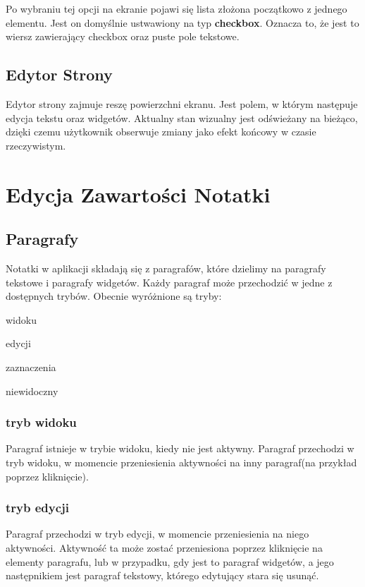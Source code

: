 \documentclass[shortabstract]{iithesis}
\begin{document}
Po wybraniu tej opcji na ekranie pojawi się lista złożona początkowo z jednego elementu.
Jest on domyślnie ustwawiony na typ \textbf{checkbox}. Oznacza to, że jest to wiersz zawierający checkbox oraz puste pole tekstowe.

\subsection{Edytor Strony}

Edytor strony zajmuje reszę powierzchni ekranu. Jest polem, w którym następuje edycja tekstu oraz widgetów. Aktualny stan wizualny jest odświeżany na bieżąco, dzięki czemu użytkownik obserwuje zmiany jako efekt końcowy w czasie rzeczywistym.



\section{Edycja Zawartości Notatki}

\subsection{Paragrafy}

Notatki w aplikacji składają się z paragrafów, które dzielimy na paragrafy tekstowe i paragrafy widgetów.
Każdy paragraf może przechodzić w jedne z dostępnych trybów.
Obecnie wyróżnione są tryby:

\begin{compactitem}
    \item widoku
    \item edycji
    \item zaznaczenia
    \item niewidoczny
\end{compactitem}

\subsubsection{tryb widoku}

Paragraf istnieje w trybie widoku, kiedy nie jest aktywny.
Paragraf przechodzi w tryb widoku, w momencie przeniesienia aktywności na inny paragraf(na przykład poprzez kliknięcie).

\subsubsection{tryb edycji}

Paragraf przechodzi w tryb edycji, w momencie przeniesienia na niego aktywności.
Aktywność ta może zostać przeniesiona poprzez kliknięcie na elementy paragrafu, lub w przypadku, gdy jest to paragraf widgetów, a jego następnikiem jest paragraf tekstowy, którego edytujący stara się usunąć.
\end{document}
